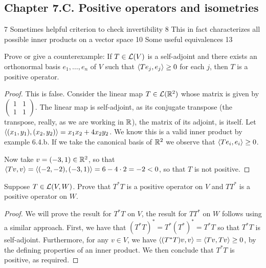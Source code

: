 \subsection*{Chapter 7.C. Positive operators and isometries}


7 Sometimes helpful criterion to check invertibility
8 This in fact characterizes all possible inner products on a vector space
10 Some useful equivalences
13 

\begin{exercise}{1}
  Prove or give a counterexample: If $T\in\mathcal{L}(V)$ is a self-adjoint and there exists an orthonormal basis $e_1,\dots,e_n$ of $V$ such that $\langle Te_j,e_j\rangle\geq 0$ for each $j$, then $T$ is a positive operator.
\end{exercise}
\begin{proof}
 This is false. Consider the linear map $T\in\mathcal{L}(\mathbb{R}^2)$ whose matrix is given by
 $\begin{pmatrix}
     1 & 1\\
     1 & 1
 \end{pmatrix}$.
 The linear map is self-adjoint, as its conjugate transpose (the transpose, really, as we are working in $\mathbb{R}$), the matrix of its adjoint, is itself. Let $\langle (x_1,y_1),(x_2,y_2)\rangle=x_1x_2+4x_2y_2$. We know this is a valid inner product by example 6.4.b. If we take the canonical basis of $\mathbb{R}^2$ we observe that $\langle Te_i,e_i\rangle\geq 0$. 

 Now take $v=(-3,1)\in\mathbb{R}^2$, so that $\langle Tv,v\rangle =\langle (-2,-2),(-3,1)\rangle =6-4\cdot 2 =-2<0$, so that $T$ is not positive.
\end{proof}

\begin{exercise}{4}
  Suppose $T\in\mathcal{L}(V,W)$. Prove that $T^\ast T$ is a positive operator on $V$ and $TT^\ast$ is a positive operator on $W$.
\end{exercise}
\begin{proof}
 We will prove the result for $T^\ast T$ on $V$, the result for $TT^\ast$ on $W$ follows using a similar approach. First, we have that $(T^\ast T)^\ast =T^\ast (T^\ast)^\ast = T^\ast T$ so that $T^\ast T$ is self-adjoint. Furthermore, for any $v\in V$, we have $\langle (T^\ast T)v,v\rangle =\langle Tv,Tv\rangle\geq 0$, by the defining properties of an inner product. We then conclude that $T^\ast T$ is positive, as required.
\end{proof}

